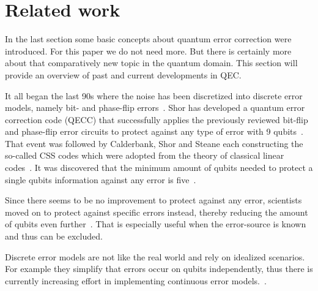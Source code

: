 \section{Related work}
\label{sec:related-work}

In the last section some basic concepts about quantum error correction were introduced.
For this paper we do not need more.
But there is certainly more about that comparatively new topic in the quantum domain.
This section will provide an overview of past and current developments in QEC.

It all began the last 90s where the noise has been discretized into discrete error models, namely bit- and phase-flip errors~\cite[p. 46999]{Li}.
Shor has developed a quantum error correction code (QECC) that successfully applies the previously reviewed bit-flip and phase-flip error circuits to protect against any type of error with 9 qubits~\cite[p. 46999]{Li}.
That event was followed by Calderbank, Shor and Steane each constructing the so-called CSS codes which were adopted from the theory of classical linear codes~\cite[Chapter: Quantum Error Correction, p. 24]{Preskill}.
It was discovered that the minimum amount of qubits needed to protect a single qubits information against any error is five~\cite[p. 46999]{Li}.

Since there seems to be no improvement to protect against any error, scientists moved on to protect against specific errors instead, thereby reducing the amount of qubits even further~\cite[p. 46999]{Li}.
That is especially useful when the error-source is known and thus can be excluded.

Discrete error models are not like the real world and rely on idealized scenarios.
For example they simplify that errors occur on qubits independently, thus there is currently increasing effort in implementing continuous error models.~\cite[p. 46999]{Li}.
